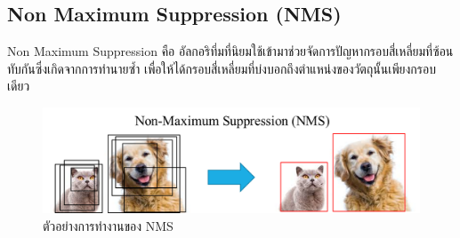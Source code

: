 \subsection*{Non Maximum Suppression (NMS)}
Non Maximum Suppression คือ อัลกอริทึ่มที่นิยมใช้เข้ามาช่วยจัดการปัญหากรอบสี่เหลี่ยมที่ซ้อนทับกันซึ่งเกิดจากการทำนายซ้ำ เพื่อให้ได้กรอบสี่เหลี่ยมที่บ่งบอกถึงตำแหน่งของวัตถุนั้นเพียงกรอบเดียว 
\begin{figure}[!ht]
	\centering
	\includegraphics[scale=0.3]{chapter2/images/NMS.png}
		\caption{ตัวอย่างการทำงานของ NMS}
    	\label{fig:NMS}
\end{figure}
